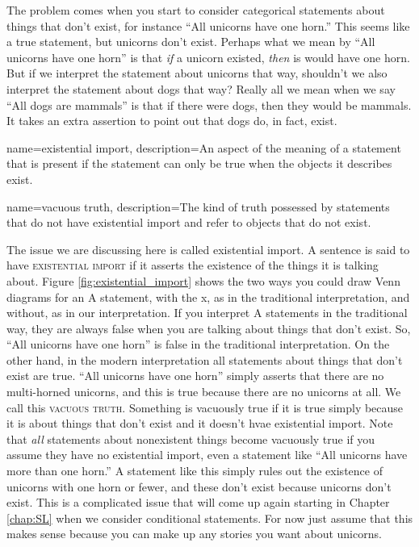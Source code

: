 The problem comes when you start to consider categorical statements about things that don't exist, for instance ``All unicorns have one horn.'' This seems like a true statement, but unicorns don't exist. Perhaps what we mean by ``All unicorns have one horn'' is that \emph{if} a unicorn existed, \emph{then} is would have one horn. But if we interpret the statement about unicorns that way, shouldn't we also interpret the statement about dogs that way? Really all we mean when we say ``All dogs are mammals'' is that if there were dogs, then they would be mammals. It takes an extra assertion to point out that dogs do, in fact, exist. 

{
name=existential import,
description={An aspect of the meaning of a statement that is present if the statement can only be true when the objects it describes exist.}
}

{
name=vacuous truth,
description={The kind of truth possessed by statements that do not have existential import and refer to objects that do not exist.}
}

The issue we are discussing here is called existential import. A sentence is said to have \textsc{\gls{existential import}} \label{def:Existential_import} if it asserts the existence of the things it is talking about. Figure \ref{fig:existential_import} shows the two ways you could draw Venn diagrams for an A statement, with the x, as in the traditional interpretation, and without, as in our interpretation. If you interpret A statements in the traditional way, they are always false when you are talking about things that don't exist. So, ``All unicorns have one horn'' is false in the traditional interpretation. On the other hand, in the modern interpretation all statements about things that don't exist are true. ``All unicorns have one horn'' simply asserts that there are no multi-horned unicorns, and this is true because there are no unicorns at all. We call this \textsc{\gls{vacuous truth}}. Something is vacuously true \label{def:Vacuous_truth} if it is true simply because it is about things that don't exist and it doesn't hvae existential import. Note that \emph{all} statements about nonexistent things become vacuously true if you assume they have no existential import, even a statement like ``All unicorns have more than one horn.'' A statement like this simply rules out the existence of unicorns with one horn or fewer, and these don't exist because unicorns don't exist. This is a complicated issue that will come up again starting in Chapter \ref{chap:SL} when we consider conditional statements. For now just assume that this makes sense because you can make up any stories you want about unicorns. 

